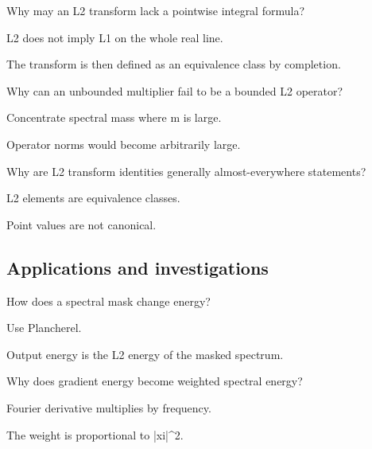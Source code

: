 \begin{exercise}[L2 not L1]\label{exr:iii13-expand-10}
Why may an L2 transform lack a pointwise integral formula?
\end{exercise}
\begin{hint}
L2 does not imply L1 on the whole real line.
\end{hint}
\begin{solution}
The transform is then defined as an equivalence class by completion.
\end{solution}

\begin{exercise}\label{exr:iii13-expand-11}
Why can an unbounded multiplier fail to be a bounded L2 operator?
\end{exercise}
\begin{hint}
Concentrate spectral mass where m is large.
\end{hint}
\begin{solution}
Operator norms would become arbitrarily large.
\end{solution}

\begin{exercise}\label{exr:iii13-expand-12}
Why are L2 transform identities generally almost-everywhere statements?
\end{exercise}
\begin{hint}
L2 elements are equivalence classes.
\end{hint}
\begin{solution}
Point values are not canonical.
\end{solution}

\subsection*{Applications and investigations}

\begin{exercise}\label{exr:iii13-expand-13}
How does a spectral mask change energy?
\end{exercise}
\begin{hint}
Use Plancherel.
\end{hint}
\begin{solution}
Output energy is the L2 energy of the masked spectrum.
\end{solution}

\begin{exercise}\label{exr:iii13-expand-14}
Why does gradient energy become weighted spectral energy?
\end{exercise}
\begin{hint}
Fourier derivative multiplies by frequency.
\end{hint}
\begin{solution}
The weight is proportional to |xi|\textasciicircum{}2.
\end{solution}

